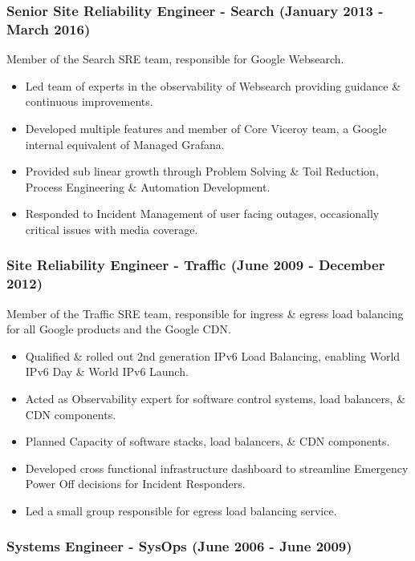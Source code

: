 \documentclass[a4paper, 10pt] {article}
\begin{document}
\subsubsection*{Senior Site Reliability Engineer - Search (January 2013 - March 2016)}

Member of the Search SRE team, responsible for Google Websearch.

\begin{itemize}
	\item Led team of experts in the observability of Websearch providing guidance \& continuous improvements.
	\item Developed multiple features and member of Core Viceroy team, a Google internal equivalent of Managed Grafana.
	\item Provided sub linear growth through Problem Solving \& Toil Reduction, Process Engineering \& Automation Development.
	\item Responded to Incident Management of user facing outages, occasionally critical issues with media coverage.
\end{itemize}

\subsubsection*{Site Reliability Engineer - Traffic (June 2009 - December 2012)}

Member of the Traffic SRE team, responsible for ingress \& egress load
balancing for all Google products and the Google CDN. 

\begin{itemize}
  \item Qualified \& rolled out 2nd generation IPv6 Load Balancing, enabling World IPv6 Day \& World IPv6 Launch.
	\item Acted as Observability expert for software control systems, load balancers, \& CDN components.
	\item Planned Capacity of software stacks, load balancers, \& CDN components.
	\item Developed cross functional infrastructure dashboard to streamline Emergency Power Off decisions for Incident Responders.
	\item Led a small group responsible for egress load balancing service.
\end{itemize}

\subsubsection*{Systems Engineer - SysOps (June 2006 - June 2009)}
\end{document}
